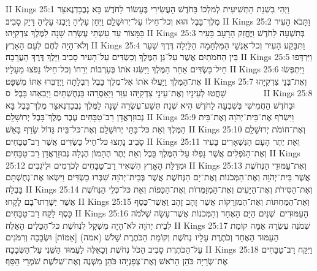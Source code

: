 II Kings 25:1	וַיְהִי בִשְׁנַת הַתְּשִׁיעִית לְמלְכוֹ בַּחֹדֶשׁ הָעֲשִׂירִי בֶּעָשׂוֹר לַחֹדֶשׁ בָּא נְבֻכַדְנֶאצַּר מֶלֶךְ־בָּבֶל הוּא וְכל־חֵילוֹ עַל־יְרוּשָׁלַ͏ִם וַיִּחַן עָלֶיהָ וַיִּבְנוּ עָלֶיהָ דָּיֵק סָבִיב׃
II Kings 25:2	וַתָּבֹא הָעִיר בַּמָּצוֹר עַד עַשְׁתֵּי עֶשְׂרֵה שָׁנָה לַמֶּלֶךְ צִדְקִיָּהוּ׃
II Kings 25:3	בְּתִשְׁעָה לַחֹדֶשׁ וַיֶּחֱזַק הָרָעָב בָּעִיר וְלֹא־הָיָה לֶחֶם לְעַם הָאָרֶץ׃
II Kings 25:4	וַתִּבָּקַע הָעִיר וְכל־אַנְשֵׁי הַמִּלְחָמָה  הַלַּיְלָה דֶּרֶךְ שַׁעַר  בֵּין הַחֹמֹתַיִם אֲשֶׁר עַל־גַּן הַמֶּלֶךְ וְכַשְׂדִּים עַל־הָעִיר סָבִיב וַיֵּלֶךְ דֶּרֶךְ הָעֲרָבָה׃
II Kings 25:5	וַיִּרְדְּפוּ חֵיל־כַּשְׂדִּים אַחַר הַמֶּלֶךְ וַיַּשִּׂגוּ אֹתוֹ בְּעַרְבוֹת יְרֵחוֹ וְכל־חֵילוֹ נָפֹצוּ מֵעָלָיו׃
II Kings 25:6	וַיִּתְפְּשׂוּ אֶת־הַמֶּלֶךְ וַיַּעֲלוּ אֹתוֹ אֶל־מֶלֶךְ בָּבֶל רִבְלָתָה וַיְדַבְּרוּ אִתּוֹ מִשְׁפָּט׃
II Kings 25:7	וְאֶת־בְּנֵי צִדְקִיָּהוּ שָׁחֲטוּ לְעֵינָיו וְאֶת־עֵינֵי צִדְקִיָּהוּ עִוֵּר וַיַּאַסְרֵהוּ בַּנְחֻשְׁתַּיִם וַיְבִאֵהוּ בָּבֶל׃ {ס}        
II Kings 25:8	וּבַחֹדֶשׁ הַחֲמִישִׁי בְּשִׁבְעָה לַחֹדֶשׁ הִיא שְׁנַת תְּשַׁע־עֶשְׂרֵה שָׁנָה לַמֶּלֶךְ נְבֻכַדְנֶאצַּר מֶלֶךְ־בָּבֶל בָּא נְבוּזַרְאֲדָן רַב־טַבָּחִים עֶבֶד מֶלֶךְ־בָּבֶל יְרוּשָׁלָ͏ִם׃
II Kings 25:9	וַיִּשְׂרֹף אֶת־בֵּית־יְהֹוָה וְאֶת־בֵּית הַמֶּלֶךְ וְאֵת כּל־בָּתֵּי יְרוּשָׁלַ͏ִם וְאֶת־כּל־בֵּית גָּדוֹל שָׂרַף בָּאֵשׁ׃
II Kings 25:10	וְאֶת־חוֹמֹת יְרוּשָׁלַ͏ִם סָבִיב נָתְצוּ כּל־חֵיל כַּשְׂדִּים אֲשֶׁר רַב־טַבָּחִים׃
II Kings 25:11	וְאֵת יֶתֶר הָעָם הַנִּשְׁאָרִים בָּעִיר וְאֶת־הַנֹּפְלִים אֲשֶׁר נָפְלוּ עַל־הַמֶּלֶךְ בָּבֶל וְאֵת יֶתֶר הֶהָמוֹן הֶגְלָה נְבוּזַרְאֲדָן רַב־טַבָּחִים׃
II Kings 25:12	וּמִדַּלַּת הָאָרֶץ הִשְׁאִיר רַב־טַבָּחִים לְכֹרְמִים וּלְיֹגְבִים׃
II Kings 25:13	וְאֶת־עַמּוּדֵי הַנְּחֹשֶׁת אֲשֶׁר בֵּית־יְהֹוָה וְאֶת־הַמְּכֹנוֹת וְאֶת־יָם הַנְּחֹשֶׁת אֲשֶׁר בְּבֵית־יְהֹוָה שִׁבְּרוּ כַשְׂדִּים וַיִּשְׂאוּ אֶת־נְחֻשְׁתָּם בָּבֶלָה׃
II Kings 25:14	וְאֶת־הַסִּירֹת וְאֶת־הַיָּעִים וְאֶת־הַמְזַמְּרוֹת וְאֶת־הַכַּפּוֹת וְאֵת כּל־כְּלֵי הַנְּחֹשֶׁת אֲשֶׁר יְשָׁרְתוּ־בָם לָקָחוּ׃
II Kings 25:15	וְאֶת־הַמַּחְתּוֹת וְאֶת־הַמִּזְרָקוֹת אֲשֶׁר זָהָב זָהָב וַאֲשֶׁר־כֶּסֶף כָּסֶף לָקַח רַב־טַבָּחִים׃
II Kings 25:16	הָעַמּוּדִים  שְׁנַיִם הַיָּם הָאֶחָד וְהַמְּכֹנוֹת אֲשֶׁר־עָשָׂה שְׁלֹמֹה לְבֵית יְהֹוָה לֹא־הָיָה מִשְׁקָל לִנְחֹשֶׁת כּל־הַכֵּלִים הָאֵלֶּה׃
II Kings 25:17	שְׁמֹנֶה עֶשְׂרֵה אַמָּה קוֹמַת  הָעַמּוּד הָאֶחָד וְכֹתֶרֶת עָלָיו  נְחֹשֶׁת וְקוֹמַת הַכֹּתֶרֶת שָׁלֹשׁ (אמה) [אַמּוֹת] וּשְׂבָכָה וְרִמֹּנִים עַל־הַכֹּתֶרֶת סָבִיב הַכֹּל נְחֹשֶׁת וְכָאֵלֶּה לַעַמּוּד הַשֵּׁנִי עַל־הַשְּׂבָכָה׃
II Kings 25:18	וַיִּקַּח רַב־טַבָּחִים אֶת־שְׂרָיָה כֹּהֵן הָרֹאשׁ וְאֶת־צְפַנְיָהוּ כֹּהֵן מִשְׁנֶה וְאֶת־שְׁלֹשֶׁת שֹׁמְרֵי הַסַּף׃
